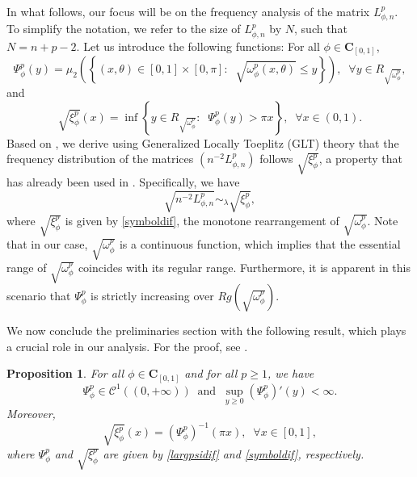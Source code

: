 \documentclass[11pt]{article}
\newtheorem{proposition}{Proposition}[section]
\begin{document}
In what follows, our focus will be on the frequency analysis of the matrix $L^{p}_{\phi,n}$. To simplify the notation, we refer to the size of $L^{p}_{\phi,n}$ by $N$, such that $N=n+p-2$. Let us introduce the following functions:
For all $\phi\in \mathbf{C}_{[0,1]}$, 
\begin{equation}\label{largpsidif}
    \Psi_{\phi}^{p}(y)=\mu_{2} \left( \left\{  (x,\theta)\in [0,1]\times[0,\pi]:\;\; \sqrt{\omega_{\phi}^p(x,\theta)}\leq y    \right\} \right),\;\;\forall y\in  R_{\sqrt{\omega_{\phi}^p}},
\end{equation}
and 
\begin{equation}\label{symboldif}
  \sqrt{\xi_{\phi}^p}(x)=\inf\left\{ y\in   R_{\sqrt{\omega_{\phi}^p}}:\;\; \Psi_{\phi}^{p}(y)>\pi  x  \right\},\;\;\forall x\in(0,1).  
\end{equation}
Based on  \cite[Theorem 10.16]{garoni2017generalized}, we derive using Generalized Locally Toeplitz (GLT) theory that the frequency distribution of the matrices $(n^{-2}L_{\phi,n}^p)$ follows $\sqrt{\xi^p_{\phi}}$, a property that has already been used in \cite{bianchi2018spectral}. Specifically, we have 
\begin{equation}\label{spectarlfrequincy}
    \sqrt{n^{-2}L_{\phi,n}^p}\sim_{\lambda}\sqrt{\xi^p_{\phi}},
\end{equation}
where $\sqrt{\xi_{\phi}^p}$ is given by \eqref{symboldif}, the monotone rearrangement of $\sqrt{\omega_\phi^p}$. Note that in our case, $ \sqrt{\omega_{\phi}^p} $ is a continuous function, which implies that the essential range of $ \sqrt{\omega_{\phi}^p} $ coincides with its regular range. Furthermore, it is apparent in this scenario that $\Psi_{\phi}^{p}$ is strictly increasing over $Rg\left(\sqrt{\omega_{\phi}^p}\right)$.

We now conclude the preliminaries section with the following result, which plays a crucial role in our analysis. For the proof, see \cite{bianchi2018spectral}.

\begin{proposition}\label{stefa}
For all  $\phi\in \mathbf{C}_{[0,1]}$ and for all $p\geq 1$, we have 
$$
\Psi_{\phi}^{p}\in \mathcal{C}^1((0,+\infty))\;\;\text{and} \;\; \sup_{y \geq 0} \left(\Psi^{p}_{\phi}\right)'(y)<\infty.
$$ 
Moreover,
\begin{equation}\label{relatioxiandPsi}
   \sqrt{\xi_{\phi}^p}(x)=\left(\Psi_{\phi}^{p}\right)^{-1}(\pi x),\;\;\forall x \in [0,1],
\end{equation}
where $\Psi_{\phi}^{p}$ and $\sqrt{\xi_{\phi}^p}$ are given by \eqref{largpsidif} and \eqref{symboldif}, respectively.
\end{proposition}
\end{document}
